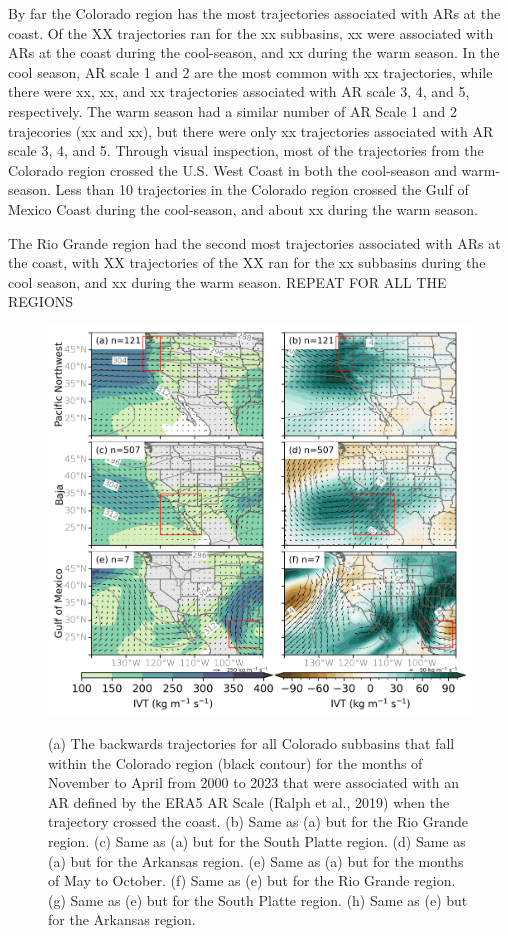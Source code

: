 \documentclass[draft]{agujournal2019}
\begin{document}
By far the Colorado region has the most trajectories associated with ARs at the coast. Of the XX trajectories ran for the xx subbasins, xx were associated with ARs at the coast during the cool-season, and xx during the warm season. In the cool season, AR scale 1 and 2 are the most common with xx trajectories, while there were xx, xx, and xx trajectories associated with AR scale 3, 4, and 5, respectively. The warm season had a similar number of AR Scale 1 and 2 trajecories (xx and xx), but there were only xx trajectories associated with AR scale 3, 4, and 5. Through visual inspection, most of the trajectories from the Colorado region crossed the U.S. West Coast in both the cool-season and warm-season. Less than 10 trajectories in the Colorado region crossed the Gulf of Mexico Coast during the cool-season, and about xx during the warm season. 

The Rio Grande region had the second most trajectories associated with ARs at the coast, with XX trajectories of the XX ran for the xx subbasins during the cool season, and xx during the warm season. REPEAT FOR ALL THE REGIONS

\begin{figure}
\noindent\includegraphics[width=\textwidth]{fig5.png}
\label{fig:spaghetti_plot}
\caption{(a) The backwards trajectories for all Colorado subbasins that fall within the Colorado region (black contour) for the months of November to April from 2000 to 2023 that were associated with an AR defined by the ERA5 AR Scale (Ralph et al., 2019) when the trajectory crossed the coast. (b) Same as (a) but for the Rio Grande region. (c) Same as (a) but for the South Platte region. (d) Same as (a) but for the Arkansas region. (e) Same as (a) but for the months of May to October. (f) Same as (e) but for the Rio Grande region. (g) Same as (e) but for the South Platte region. (h) Same as (e) but for the Arkansas region.}
\end{figure}
\end{document}
